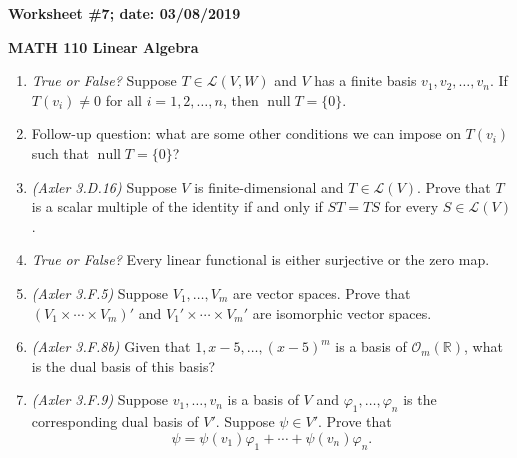 \documentclass{article}
\newcommand{\RR}{\mathbb{R}}
\newcommand{\cL}{\mathcal{L}}
\DeclareMathOperator*{\opnull}{null}
\begin{document}
{\bf Worksheet \#7; date: 03/08/2019}

{\bf MATH 110 Linear Algebra}

\begin{enumerate}
\item {\em True or False?} Suppose $T \in \cL(V, W)$ and $V$ has a finite basis $v_1, v_2, \ldots, v_n$. If $T(v_i) \ne 0$ for all $i = 1, 2, \ldots, n$, then $\opnull T = \{0\}$.

\item Follow-up question: what are some other conditions we can impose on $T(v_i)$ such that $\opnull T = \{0\}$?

\item {\em (Axler 3.D.16)} Suppose $V$ is finite-dimensional and $T \in \cL(V)$. Prove that $T$ is a scalar multiple of the identity if and only if $ST = TS$ for every $S \in \cL(V)$.

\item {\em True or False?} Every linear functional is either surjective or the zero map.

\item {\em (Axler 3.F.5)} Suppose $V_1, \ldots, V_m$ are vector spaces. Prove that $(V_1 \times \cdots \times V_m)'$ and $V_1' \times \cdots \times V_m'$ are isomorphic vector spaces.

\item {\em (Axler 3.F.8b)} Given that $1, x-5, \ldots, (x-5)^m$ is a basis of $\mathcal{O}_m(\RR)$, what is the dual basis of this basis?

\item {\em (Axler 3.F.9)} Suppose $v_1, \ldots, v_n$ is a basis of $V$ and $\varphi_1, \ldots, \varphi_n$ is the corresponding dual basis of $V'$. Suppose $\psi \in V'$. Prove that
\[
	\psi = \psi(v_1) \varphi_1 + \cdots + \psi(v_n) \varphi_n.
\]

\end{enumerate}
\end{document}

